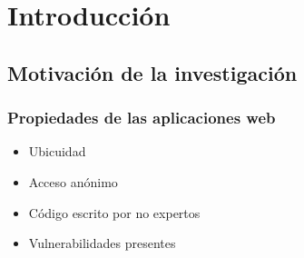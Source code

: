 \section{Introducción}



\subsection{Motivación de la investigación}

\begin{frame}
    \frametitle{Propiedades de las aplicaciones web}

    \begin{itemize}

        \item
        Ubicuidad %

        \item
        Acceso anónimo

        \item
        Código escrito por no expertos

        \item
        Vulnerabilidades presentes

    \end{itemize}
\end{frame}

